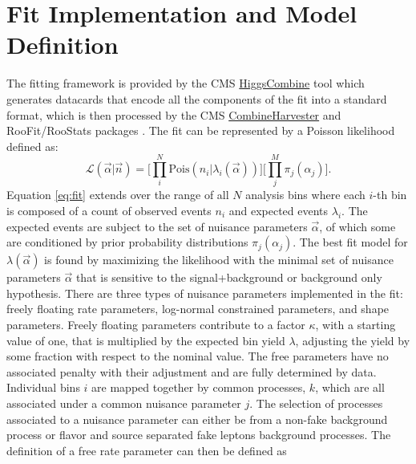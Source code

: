 



\section{Fit Implementation and Model Definition}
The fitting framework is provided by the CMS \url{HiggsCombine} tool which generates datacards that encode all the components of the fit into a standard format, which is then processed by the CMS \url{CombineHarvester} and RooFit/RooStats packages \cite{Antcheva:2009zz}\cite{moneta2011roostats}. The fit can be represented by a Poisson likelihood defined as:
\begin{equation}
\label{eq:fit}
\mathcal{L}(\vec{\alpha}|\vec{n}) = \bigg[ \prod_i^N \text{Pois}(n_i|\lambda_i(\vec{\alpha})) \bigg] \bigg[\prod_j^M \pi_j(\alpha_j) \bigg].
\end{equation}
Equation \ref{eq:fit} extends over the range of all $N$ analysis bins where each $i$-th bin is composed of a count of observed events $n_i$ and expected events $\lambda_i$. The expected events are subject to the set of nuisance parameters $\vec{\alpha}$, of which some are conditioned by prior probability distributions $\pi_j(\alpha_j)$. The best fit model for $\lambda(\vec{\alpha})$ is found by maximizing the likelihood with the minimal set of nuisance parameters $\vec{\alpha}$ that is sensitive to the signal+background or background only hypothesis.  There are three types of nuisance parameters implemented in the fit: freely floating rate parameters, log-normal constrained parameters, and shape parameters.  Freely floating parameters contribute to a factor $\kappa$, with a starting value of one, that is multiplied by the expected bin yield $\lambda$, adjusting the yield by some fraction with respect to the nominal value. The free parameters have no associated penalty with their adjustment and are fully determined by data. Individual bins $i$ are mapped together by common processes, $k$, which are all associated under a common nuisance parameter $j$. The selection of processes associated to a nuisance parameter can either be  from a non-fake background process or flavor and source separated fake leptons background processes. The definition of a free rate parameter can then be defined as 
